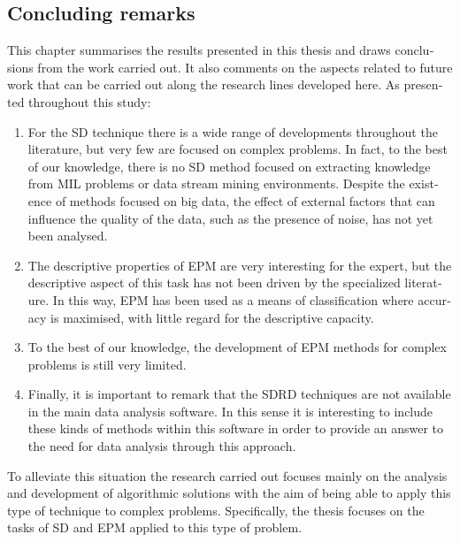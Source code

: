 \documentclass[c5paper,10pt,twoside]{book}	   	%
\begin{document}
\clearpage{} \cleardoublepage

\begin{otherlanguage}{british}
	   \lhead[ ]{\footnotesize{\sc{\thesection: \rm\rightmark}}}  \clearpage{}\setcounter{chapter}{2}
\chapter{Concluding remarks} \label{chap:conclusion_en}

This chapter summarises the results presented in this thesis and draws conclusions from the work carried out. It also comments on the aspects related to future work that can be carried out along the research lines developed here. As presented throughout this study:


\begin{enumerate}
	\item For the \ac{SD} technique there is a wide range of developments throughout the literature, but very few are focused on complex problems. In fact, to the best of our knowledge, there is no \ac{SD} method focused on extracting knowledge from MIL problems or data stream mining environments. Despite the existence of methods focused on big data, the effect of external factors that can influence the quality of the data, such as the presence of noise, has not yet been analysed.
	
	\item The descriptive properties of \ac{EPM} are very interesting for the expert, but the descriptive aspect of this task has not been driven by the specialized literature. In this way, \ac{EPM} has been used as a means of classification where accuracy is maximised, with little regard for the descriptive capacity.
	
	\item To the best of our knowledge, the development of \ac{EPM} methods for complex problems is still very limited.
	
	\item Finally, it is important to remark that the \ac{SDRD} techniques are not available in the main data analysis software. In this sense it is interesting to include these kinds of methods within this software in order to provide an answer to the need for data analysis through this approach.
\end{enumerate}

To alleviate this situation the research carried out focuses mainly on the analysis and development of algorithmic solutions with the aim of being able to apply this type of technique to complex problems. Specifically, the thesis focuses on the tasks of \ac{SD} and \ac{EPM} applied to this type of problem.



\end{otherlanguage}
\end{document}
